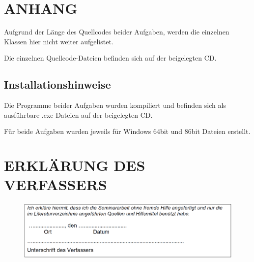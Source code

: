 \documentclass[a4paper,12pt]{article}
\begin{document}

\newpage
\section{ANHANG}
Aufgrund der Länge des Quellcodes beider Aufgaben, werden die einzelnen Klassen hier nicht weiter aufgelistet.

Die einzelnen Quellcode-Dateien befinden sich auf der beigelegten CD.

\subsection{Installationshinweise}
Die Programme beider Aufgaben wurden kompiliert und befinden sich als ausführbare .exe Dateien auf der beigelegten CD.

Für beide Aufgaben wurden jeweils für Windows 64bit und 86bit Dateien erstellt.


\newpage
\section{ERKLÄRUNG DES VERFASSERS}

\begin{figure}[H]
    \includegraphics[width=\linewidth]{Bilder/Sonstiges/ErklaerungDesVerfassers.png}
\end{figure}
\end{document}
